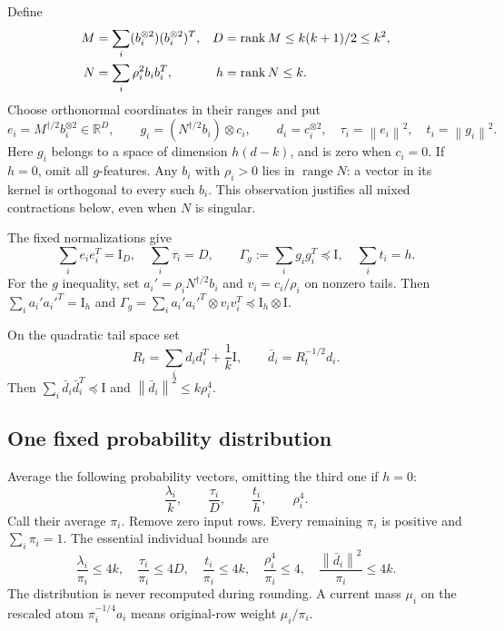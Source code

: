 \documentclass[11pt]{article}
\theoremstyle{remark}\newtheorem{remark}[theorem]{Remark}
\newcommand{\R}{\mathbb R}\newcommand{\E}{\mathbb E}\newcommand{\Prob}{\mathbb P}
\newcommand{\norm}[1]{\left\lVert#1\right\rVert}\newcommand{\abs}[1]{\left|#1\right|}
\newcommand{\Id}{\mathrm I}\newcommand{\dbar}{\bar d}
\numberwithin{equation}{section}
\begin{document}
Define
\begin{align}
 M&=\sum_i(b_i^{\otimes2})(b_i^{\otimes2})^T,
 &D&=\operatorname{rank} M\le k(k+1)/2\le k^2,\label{eq:M}\\
 N&=\sum_i\rho_i^2 b_i b_i^T,
 &h&=\operatorname{rank} N\le k.\label{eq:N}
\end{align}
Choose orthonormal coordinates in their ranges and put
\begin{equation}\label{eq:egdt}
 e_i=M^{\dagger/2}b_i^{\otimes2}\in\R^D,\qquad
 g_i=(N^{\dagger/2}b_i)\otimes c_i,\qquad
 d_i=c_i^{\otimes2},\quad
 \tau_i=\norm{e_i}^2,\quad t_i=\norm{g_i}^2.
\end{equation}
Here $g_i$ belongs to a space of dimension $h(d-k)$, and is zero when $c_i=0$. If $h=0$, omit all $g$-features. Any $b_i$ with $\rho_i>0$ lies in $\operatorname{range}N$: a vector in its kernel is orthogonal to every such $b_i$. This observation justifies all mixed contractions below, even when $N$ is singular.

The fixed normalizations give
\begin{equation}\label{eq:featurebounds}
 \sum_i e_i e_i^T=\Id_D,\quad \sum_i\tau_i=D,
 \qquad \Gamma_g:=\sum_i g_i g_i^T\preceq\Id,\quad\sum_i t_i=h.
\end{equation}
For the $g$ inequality, set $a_i'=\rho_iN^{\dagger/2}b_i$ and $v_i=c_i/\rho_i$ on nonzero tails. Then $\sum_i a_i'a_i'^T=\Id_h$ and
$\Gamma_g=\sum_i a_i'a_i'^T\otimes v_iv_i^T\preceq\Id_h\otimes\Id$.

On the quadratic tail space set
\begin{equation}\label{eq:Rtail}
 R_t=\sum_i d_i d_i^T+\frac1k\Id,\qquad \dbar_i=R_t^{-1/2}d_i.
\end{equation}
Then $\sum_i\dbar_i\dbar_i^T\preceq\Id$ and $\norm{\dbar_i}^2\le k\rho_i^4$.

\subsection{One fixed probability distribution}
Average the following probability vectors, omitting the third one if $h=0$:
\begin{equation}\label{eq:pi}
 \frac{\lambda_i}{k},\qquad \frac{\tau_i}{D},\qquad
 \frac{t_i}{h},\qquad \rho_i^4.
\end{equation}
Call their average $\pi_i$. Remove zero input rows. Every remaining $\pi_i$ is positive and $\sum_i\pi_i=1$. The essential individual bounds are
\begin{equation}\label{eq:ratios}
 \frac{\lambda_i}{\pi_i}\le4k,\quad
 \frac{\tau_i}{\pi_i}\le4D,\quad
 \frac{t_i}{\pi_i}\le4k,\quad
 \frac{\rho_i^4}{\pi_i}\le4,\quad
 \frac{\norm{\dbar_i}^2}{\pi_i}\le4k.
\end{equation}
The distribution is never recomputed during rounding. A current mass $\mu_i$ on the rescaled atom $\pi_i^{-1/4}a_i$ means original-row weight $\mu_i/\pi_i$.
\end{document}
